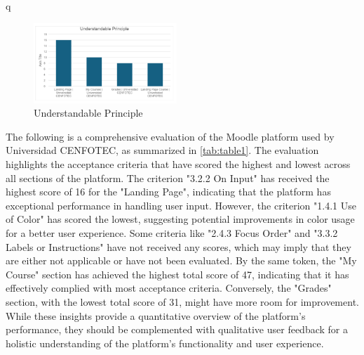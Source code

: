 \documentclass{IEEEtran}
\begin{document}
q
\begin{figure}[H]
    \includegraphics[width=0.48\textwidth]{images/undestandablePrinciple.png}
    \caption{Understandable Principle}
    \label{fig:figure7}
\end{figure}


The following is a comprehensive evaluation of the Moodle platform used by Universidad CENFOTEC, as summarized in \ref{tab:table1}. The evaluation highlights the acceptance criteria that have scored the highest and lowest across all sections of the platform. The criterion "3.2.2 On Input" has received the highest score of 16 for the "Landing Page", indicating that the platform has exceptional performance in handling user input. However, the criterion "1.4.1 Use of Color" has scored the lowest, suggesting potential improvements in color usage for a better user experience. Some criteria like "2.4.3 Focus Order" and "3.3.2 Labels or Instructions" have not received any scores, which may imply that they are either not applicable or have not been evaluated. By the same token, the "My Course" section has achieved the highest total score of 47, indicating that it has effectively complied with most acceptance criteria. Conversely, the "Grades" section, with the lowest total score of 31, might have more room for improvement. While these insights provide a quantitative overview of the platform's performance, they should be complemented with qualitative user feedback for a holistic understanding of the platform's functionality and user experience.
\end{document}

